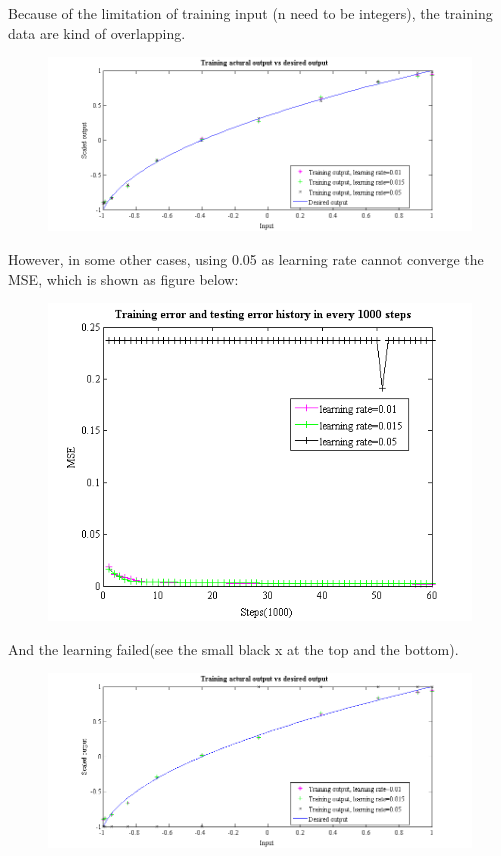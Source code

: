 \documentclass[epsfig]{article}
\begin{document}
Because of the limitation of training input (n need to be integers), the training data are kind of overlapping.

\begin{figure}[!htb] 
\centering\includegraphics[width=6.5in]{lr_out1.png} 
\end{figure} 




\clearpage

However, in some other cases, using 0.05 as learning rate cannot converge the MSE, which is shown as figure below:

\begin{figure}[!htb] 
\centering\includegraphics[width=4.5in]{lr_err2.png} 
\end{figure} 

And the learning failed(see the small black x at the top and the bottom). 

\begin{figure}[!htb] 
\centering\includegraphics[width=6.5in]{lr_out2.png} 
\end{figure} 
\end{document}
